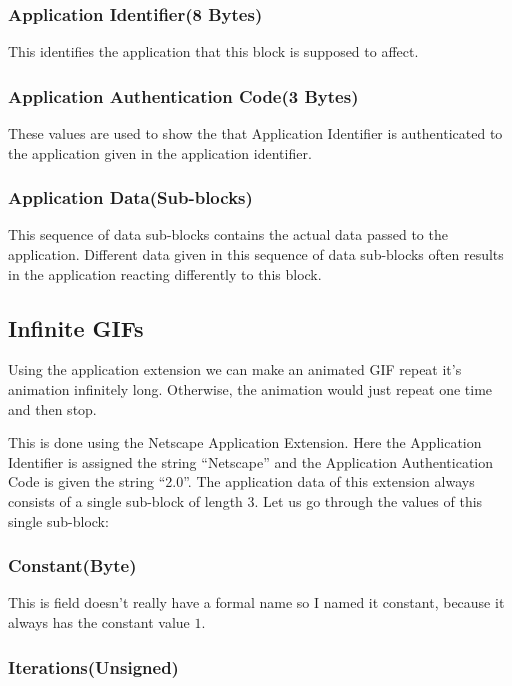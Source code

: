 \subsubsection{Application Identifier(8 Bytes)}

This identifies the application that this block is supposed to
affect.

\subsubsection{Application Authentication Code(3 Bytes)}

These values are used to show the that Application Identifier is
authenticated to the application given in the application
identifier.

\subsubsection{Application Data(Sub-blocks)}

This sequence of data sub-blocks contains the actual data passed to
the application. Different data given in this sequence of data
sub-blocks often results in the application reacting differently to
this block.

\subsection{Infinite GIFs}

Using the application extension we can make an animated GIF repeat
it's animation infinitely long. Otherwise, the animation would just
repeat one time and then stop.

This is done using the Netscape Application Extension. Here the
Application Identifier is assigned the string ``Netscape'' and the
Application Authentication Code is given the string ``2.0''. The
application data of this extension always consists of a single
sub-block of length 3. Let us go through the values of this single
sub-block: \cite{frazier97:_all_about_gif89}

\subsubsection{Constant(Byte)}

This is field doesn't really have a formal name so I named it
constant, because it always has the constant value $1$.

\subsubsection{Iterations(Unsigned)}

